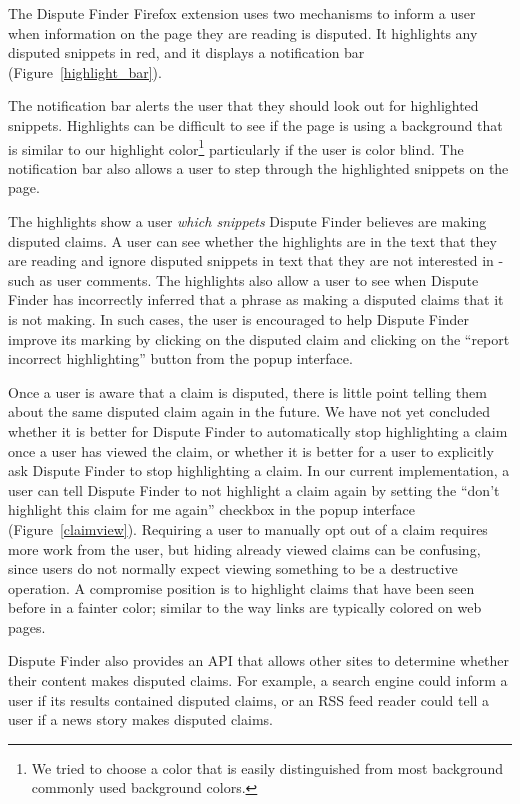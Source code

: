 \documentclass{www2010-submission}
\newcommand{\todo}[1]{}
\begin{document}
The Dispute Finder Firefox extension uses two mechanisms to inform a user when information on the page they are reading is disputed. It highlights any disputed snippets in red, and it displays a notification bar (Figure~\ref{highlight_bar}). 

The notification bar alerts the user that they should look out for highlighted snippets. Highlights can be difficult to see if the page is using a background that is similar to our highlight color\footnote{We tried to choose a color that is easily distinguished from most background commonly used background colors.} particularly if the user is color blind. The notification bar also allows a user to step through the highlighted snippets on the page.

The highlights show a user {\it which snippets} Dispute Finder believes are making disputed claims. A user can see whether the highlights are in the text that they are reading and ignore disputed snippets in text that they are not interested in - such as user comments. The highlights also allow a user to see when Dispute Finder has incorrectly inferred that a phrase as making a disputed claims that it is not making. In such cases, the user is encouraged to help Dispute Finder improve its marking by clicking on the disputed claim and clicking on the ``report incorrect highlighting'' button from the popup interface.

Once a user is aware that a claim is disputed, there is little point telling them about the same disputed claim again in the future. We have not yet concluded whether it is better for Dispute Finder to automatically stop highlighting a claim once a user has viewed the claim, or whether it is better for a user to explicitly ask Dispute Finder to stop highlighting a claim. In our current implementation, a user can tell Dispute Finder to not highlight a claim again by setting the ``don't highlight this claim for me again'' checkbox in the popup interface (Figure~\ref{claimview}). Requiring a user to manually opt out of a claim requires more work from the user, but hiding already viewed claims can be confusing, since users do not normally expect viewing something to be a destructive operation. A compromise position is to highlight claims that have been seen before in a fainter color; similar to the way links are typically colored on web pages.

\todo{Try using a fainter color}

\todo{Text is wrong in the screenshot}

Dispute Finder also provides an API that allows other sites to determine whether their content makes disputed claims. For example, a search engine could inform a user if its results contained disputed claims, or an RSS feed reader could tell a user if a news story makes disputed claims.
\end{document}
